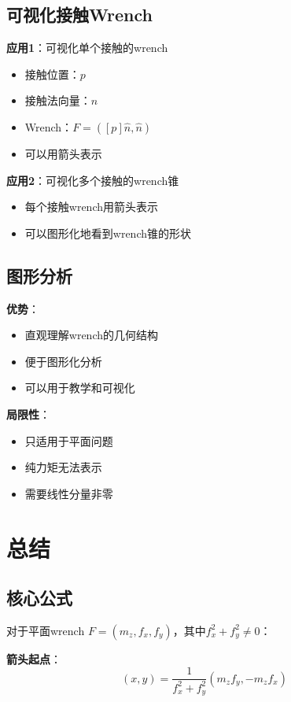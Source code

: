 \documentclass[12pt,a4paper]{article}
\begin{document}
\subsection{可视化接触Wrench}

\textbf{应用1}：可视化单个接触的wrench
\begin{itemize}
\item 接触位置：$p$
\item 接触法向量：$\hat{n}$
\item Wrench：$F = ([p] \hat{n}, \hat{n})$
\item 可以用箭头表示
\end{itemize}

\textbf{应用2}：可视化多个接触的wrench锥
\begin{itemize}
\item 每个接触wrench用箭头表示
\item 可以图形化地看到wrench锥的形状
\end{itemize}

\subsection{图形分析}

\textbf{优势}：
\begin{itemize}
\item 直观理解wrench的几何结构
\item 便于图形化分析
\item 可以用于教学和可视化
\end{itemize}

\textbf{局限性}：
\begin{itemize}
\item 只适用于平面问题
\item 纯力矩无法表示
\item 需要线性分量非零
\end{itemize}

\section{总结}

\subsection{核心公式}

对于平面wrench $F = (m_z, f_x, f_y)$，其中$f_x^2 + f_y^2 \neq 0$：

\textbf{箭头起点}：
\begin{equation}
(x, y) = \frac{1}{f_x^2 + f_y^2} (m_z f_y, -m_z f_x)
\end{equation}
\end{document}
